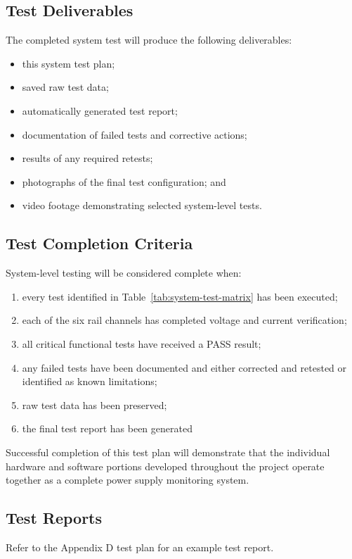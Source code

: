 \subsection{Test Deliverables}

The completed system test will produce the following deliverables:

\begin{itemize}
	\item this system test plan;
	\item saved raw test data;
	\item automatically generated test report;
	\item documentation of failed tests and corrective actions;
	\item results of any required retests;
	\item photographs of the final test configuration; and
	\item video footage demonstrating selected system-level tests.
\end{itemize}

\subsection{Test Completion Criteria}

System-level testing will be considered complete when:

\begin{enumerate}
	\item every test identified in Table~\ref{tab:system-test-matrix} has been executed;
	\item each of the six rail channels has completed voltage and current verification;
	\item all critical functional tests have received a PASS result;
	\item any failed tests have been documented and either corrected and retested or
	identified as known limitations;
	\item raw test data has been preserved;
	\item the final test report has been generated
\end{enumerate}

Successful completion of this test plan will demonstrate that the individual hardware
and software portions developed throughout the project operate together as a complete
power supply monitoring system.

\subsection{Test Reports}
Refer to the Appendix D test plan for an example test report.